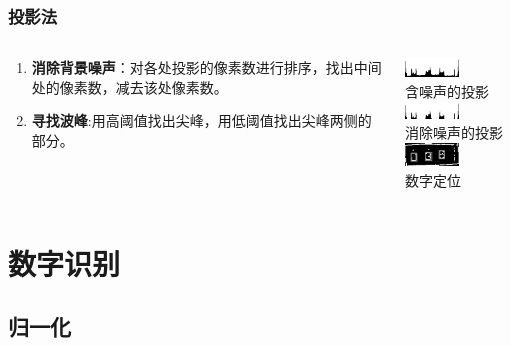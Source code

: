 \documentclass[12pt,hyperref={CJKbookmarks=true}]{beamer}
\begin{document}
\begin{frame}
  \frametitle{投影法}
  \begin{columns}[onlytextwidth]
    \begin{column}{0.5\textwidth}
      \begin{enumerate}
      \item \textbf{消除背景噪声}：对各处投影的像素数进行排序，找出中间处的像素数，减去该处像素数。
      \item \textbf{寻找波峰}:用高阈值找出尖峰，用低阈值找出尖峰两侧的部分。
      \end{enumerate}
    \end{column}
    \begin{column}{0.5\textwidth}
      \centering
      \includegraphics[width=0.5\textwidth]{projectx.png}\\
      \footnotesize 含噪声的投影\\
      \includegraphics[width=0.5\textwidth]{proclear.png}\\
      \footnotesize 消除噪声的投影\\[5pt]
      \includegraphics[width=0.5\textwidth]{segment.png}\\
      \footnotesize 数字定位
    \end{column}
  \end{columns}
\end{frame}

\section{数字识别}

\subsection{归一化}
\end{document}
